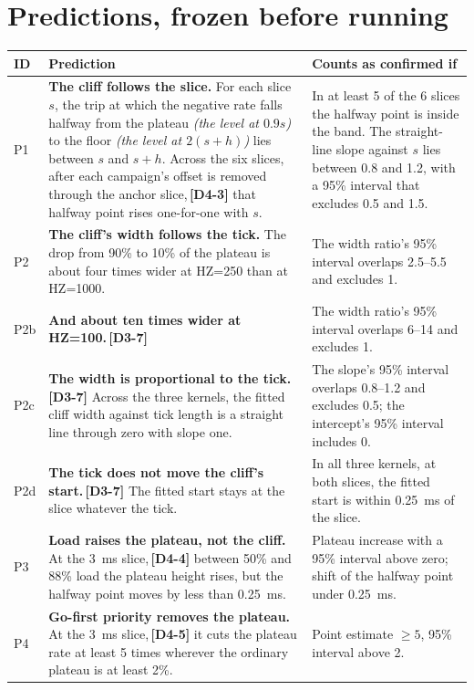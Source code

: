 \documentclass[11pt]{article}
\newcommand{\gl}[1]{{\color{soft}\itshape\small (#1)}}
\newcommand{\chgold}[1]{\,{\color{oldcol}\bfseries\footnotesize[#1]}}
\begin{document}
\section{Predictions, frozen before running}\label{sec:predictions}
{\small
\begin{longtable}{@{}p{1.0cm} p{9.5cm} p{5.6cm}@{}}
\toprule
\textbf{ID} & \textbf{Prediction} & \textbf{Counts as confirmed if} \\
\midrule
\endhead
P1 & \textbf{The cliff follows the slice.} For each slice $s$, the trip at which the negative rate falls halfway from the plateau \gl{the level at $0.9s$} to the floor \gl{the level at $2(s+h)$} lies between $s$ and $s + h$. Across the six slices, after each campaign's offset is removed through the anchor slice,\chgold{D4-3} that halfway point rises one-for-one with $s$. & In at least 5 of the 6 slices the halfway point is inside the band. The straight-line slope against $s$ lies between 0.8 and 1.2, with a 95\% interval that excludes 0.5 and 1.5. \\
P2 & \textbf{The cliff's width follows the tick.} The drop from 90\% to 10\% of the plateau is about four times wider at HZ=250 than at HZ=1000. & The width ratio's 95\% interval overlaps 2.5--5.5 and excludes 1. \\
P2b & \textbf{And about ten times wider at HZ=100.}\chgold{D3-7} & The width ratio's 95\% interval overlaps 6--14 and excludes 1. \\
P2c & \textbf{The width is proportional to the tick.}\chgold{D3-7} Across the three kernels, the fitted cliff width against tick length is a straight line through zero with slope one. & The slope's 95\% interval overlaps 0.8--1.2 and excludes 0.5; the intercept's 95\% interval includes 0. \\
P2d & \textbf{The tick does not move the cliff's start.}\chgold{D3-7} The fitted start stays at the slice whatever the tick. & In all three kernels, at both slices, the fitted start is within 0.25~ms of the slice. \\
P3 & \textbf{Load raises the plateau, not the cliff.} At the 3~ms slice,\chgold{D4-4} between 50\% and 88\% load the plateau height rises, but the halfway point moves by less than 0.25~ms. & Plateau increase with a 95\% interval above zero; shift of the halfway point under 0.25~ms. \\
P4 & \textbf{Go-first priority removes the plateau.} At the 3~ms slice,\chgold{D4-5} it cuts the plateau rate at least 5 times wherever the ordinary plateau is at least 2\%. & Point estimate $\ge 5$, 95\% interval above 2. \\

\end{longtable}}
\end{document}
